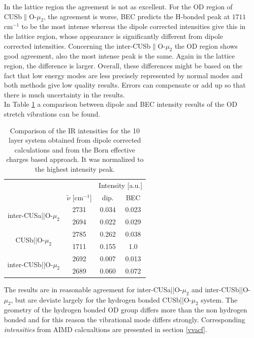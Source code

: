 \documentclass[11pt,DIV=13,BCOR=5mm,a4paper,headinclude]{scrbook}
\begin{document}
In the lattice region the agreement is not as excellent.
For the OD region of CUSb$\parallel$O-$\mu_2$, the agreement is worse, BEC predicts the H-bonded peak at $1711\,$cm$^{-1}$ to be the most intense whereas the dipole corrected intensities give this in the lattice region, whose appearance is significantly different from dipole corrected intensities.
Concerning the inter-CUSb$\parallel$O-$\mu_2$ the OD region shows good agreement, also the most intense peak is the same.
Again in the lattice region, the difference is larger.
Overall, these differences might be based on the fact that low energy modes are less precisely represented by normal modes and both methods give low quality results.
Errors can compensate or add up so that there is much uncertainty in the results.
\\ 
In Table \ref{tab:freq_lowcov_comp} a comparison between dipole and BEC intensity results of the OD stretch vibrations can be found.
\begin{table}[!h]
\centering
\caption{Comparison of the IR intensities for the 10 layer system obtained from dipole corrected calculations and from the Born effective charges based approach.
It was normalized to the highest intensity peak.}
\begin{tabular}{cc|cc}
\toprule
&&\multicolumn{2}{c}{Intensity [a.u.]}\\
&$\tilde{\nu}$ [cm$^{-1}$]& dip. & BEC \\\midrule
\multirow{2}{3cm}{inter-CUSa||O-$ \mu_2$}&2731 &0.034 &0.023 \\
 &2694&0.022 &0.029 \\\hline
\multirow{2}{3cm}{CUSb||O-$ \mu_2$} & 2785&0.262 &0.038 \\
 & 1711& 0.155&1.0 \\\hline
\multirow{2}{3cm}{inter-CUSb||O-$ \mu_2$}& 2692& 0.007&0.013 \\
 & 2689& 0.060& 0.072\\\bottomrule
\end{tabular}
\label{tab:freq_lowcov_comp}
\end{table}
The results are in reasonable agreement for inter-CUSa||O-$ \mu_2$ and inter-CUSb||O-$ \mu_2$, but are deviate largely for the hydrogen bonded CUSb||O-$ \mu_2$ system.
The geometry of the hydrogen bonded OD group differs more than the non hydrogen bonded and for this reason the vibrational mode differs strongly.
Corresponding \textit{intensities} from AIMD calcualtions are presented in section \ref{vvacf}.
\end{document}
